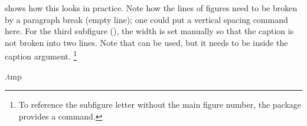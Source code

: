  shows how this looks in practice.
Note how the lines of figures need to be broken by a paragraph break (empty line);
one could put a vertical spacing command here.
For the third subfigure (),
the width is set manually so that the caption is not broken into two lines.
Note that  can be used, but it needs to be inside the caption argument.%
\footnote{To reference the subfigure letter without the main figure number,
the package provides a  command.}
%
\begin{VerbatimOut}{\jobname.tmp}
\begin{figure}
\centering



\end{figure}
\end{VerbatimOut}
